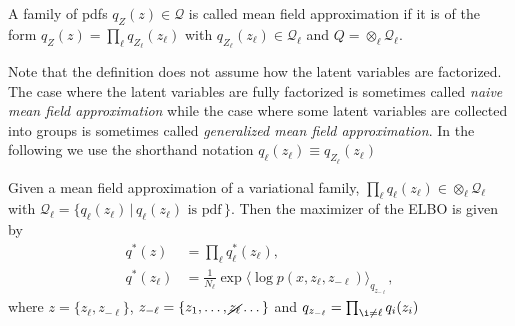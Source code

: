 \begin{definition}\label{def:mean_field}
	A family of pdfs $q_Z(z) \in \mathcal Q$ is called mean field approximation if it is of the form $q_Z(z) = \prod _\ell q_{Z_\ell}(z_\ell)$ with  
	$q_{Z_\ell}(z_\ell)\in\mathcal Q_\ell $ and $Q = \otimes_\ell\mathcal Q_\ell$.
\end{definition}
Note that the definition does not assume how the latent variables are factorized. The case where the latent variables are fully factorized is sometimes called \textit{naive mean field approximation} while the case where  some latent variables are collected into groups is sometimes called \textit{generalized mean field approximation}.
In the following we use the shorthand notation $q_\ell(z_\ell) \equiv q_{Z_\ell}(z_\ell)$
\begin{theorem}\label{thm:mf_elbo}
	Given a mean field approximation of a variational family,  $\prod _\ell q_\ell(z_\ell) \in  \otimes_\ell \mathcal Q_\ell$ with $\mathcal Q_\ell=\{q_\ell(z_\ell)\,|\,q_\ell(z_\ell) \text{ is pdf}\,\}$. Then the maximizer of the ELBO is given by
	\begin{align}
		q^*(z) &= \prod _\ell q^*_\ell(z_\ell), \label{eq: mean_field_joint}\\
		q^*(z_\ell) &= \frac{1}{N_\ell} \exp{\langle \log p(x, z_\ell, z_{-\ell}) \rangle_{q_{z_{-\ell}}}}, \label{eq:mean_field_update}
	\end{align}
	where $z=\{z_\ell, z_{-\ell} \}$,  $z_{-\ell} = \{z_1, \dots, \cancel{z_\ell} \dots\}$ and $q_{z_{-\ell}} = \prod _{\i\neq \ell} q_i(z_i)$
\end{theorem}
